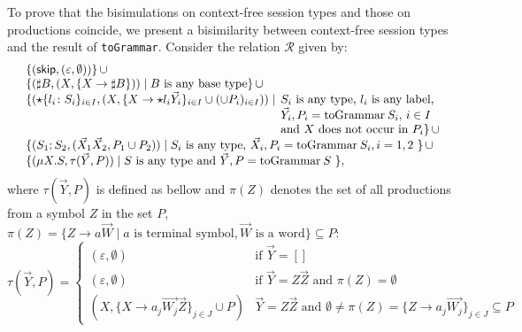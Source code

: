 To prove that the bisimulations on context-free session types and
those on productions coincide, we present a bisimilarity between
context-free session types and the result of \lstinline|toGrammar|.
%
%
Consider the relation $\mathcal{R}$ given by:
\[\begin{array}{lll}
	& \{ (\skipk, (\varepsilon, \emptyset))\} \,\cup\\
	& \{(\sharp B,(X,\{X \rightarrow \sharp B\})) \mid \text{$B$ is any base type}\} 
	   \,\cup\\
	& \{ (\star\{l_i\colon S_i\}_{i\in I}, (X, \{X \rightarrow \star l_i
    \vec Y_i\}_{i\in I} \cup (\cup  P_i)_{i\in I})) \mid 
    \begin{array}[t]{l}
    	\!\!\text{$S_i$ is any type, $l_i$ is any label,}\\
    	\!\!\text{$\vec Y_i, P_i = \toGrammarf{S_i}$, $i \in I$ }\\
    	\!\!\text{and $X$ does not occur in $P_i$}\} \,\cup\\
    \end{array}\\
    &\{(S_1;S_2, (\vec X_1\vec X_2,  P_1 \cup  P_2)) \mid
    \text{$S_i$ is any type, $\vec X_i, P_i = \toGrammarf{S_i}, i = 1,2$ } \}\,\cup\\
	& \{(\mu X.S, \tau(\vec Y, P))\mid
    \text{$S$ is any type and $\vec Y, P = \toGrammarf{S}$ }\},\\
\end{array}\]
where $\tau(\vec Y, P)$ is defined as bellow and $\pi (Z)$
denotes the set of all productions from a symbol $Z$ in the set $P$, 
$\pi (Z) = \{Z \rightarrow a \vec {W}\mid a \text{ is terminal
symbol}, \vec W \text{ is a word}\}\subseteq P$:
\[
\tau (\vec Y, P ) = 
\begin{cases}
	(\varepsilon, \emptyset) & \text{if } \vec Y =[]\\
	(\varepsilon, \emptyset) & \text{if } \vec Y = Z\vec Z \text{ and } \pi(Z) = \emptyset \\	
	(X, \{X \rightarrow a_j \vec {W_j}\vec Z\}_{j\in J} \cup  P) &
	\vec Y = Z\vec Z \text{ and } \emptyset \neq \pi(Z) = 
	\{Z \rightarrow a_j \vec {W_j}\}_{j\in J}\subseteq P
\end{cases}
\]

